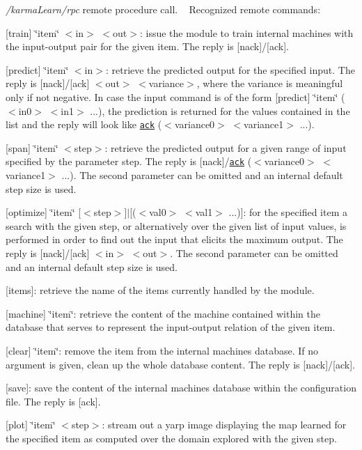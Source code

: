 \begin{DoxyItemize}
\item {\itshape /karma\+Learn/rpc} remote procedure call. ~\newline
 Recognized remote commands\+:
\begin{DoxyItemize}
\item \mbox{[}train\mbox{]} \char`\"{}item\char`\"{} $<$in$>$ $<$out$>$\+: issue the module to train internal machines with the input-\/output pair for the given item. The reply is \mbox{[}nack\mbox{]}/\mbox{[}ack\mbox{]}.
\item \mbox{[}predict\mbox{]} \char`\"{}item\char`\"{} $<$in$>$\+: retrieve the predicted output for the specified input. The reply is \mbox{[}nack\mbox{]}/\mbox{[}ack\mbox{]} $<$out$>$ $<$variance$>$, where the variance is meaningful only if not negative. In case the input command is of the form \mbox{[}predict\mbox{]} \char`\"{}item\char`\"{} ($<$in0$>$ $<$in1$>$ ...), the prediction is returned for the values contained in the list and the reply will look like \href{out0> <out1> ...}{\tt ack} ($<$variance0$>$ $<$variance1$>$ ...).
\item \mbox{[}span\mbox{]} \char`\"{}item\char`\"{} $<$step$>$\+: retrieve the predicted output for a given range of input specified by the parameter step. The reply is \mbox{[}nack\mbox{]}/\href{out0> <out1> ...}{\tt ack} ($<$variance0$>$ $<$variance1$>$ ...). The second parameter can be omitted and an internal default step size is used.
\item \mbox{[}optimize\mbox{]} \char`\"{}item\char`\"{} \mbox{[}$<$step$>$\mbox{]}$\vert$\mbox{[}($<$val0$>$ $<$val1$>$ ...)\mbox{]}\+: for the specified item a search with the given step, or alternatively over the given list of input values, is performed in order to find out the input that elicits the maximum output. The reply is \mbox{[}nack\mbox{]}/\mbox{[}ack\mbox{]} $<$in$>$ $<$out$>$. The second parameter can be omitted and an internal default step size is used.
\item \mbox{[}items\mbox{]}\+: retrieve the name of the items currently handled by the module.
\item \mbox{[}machine\mbox{]} \char`\"{}item\char`\"{}\+: retrieve the content of the machine contained within the database that serves to represent the input-\/output relation of the given item.
\item \mbox{[}clear\mbox{]} \char`\"{}item\char`\"{}\+: remove the item from the internal machines database. If no argument is given, clean up the whole database content. The reply is \mbox{[}nack\mbox{]}/\mbox{[}ack\mbox{]}.
\item \mbox{[}save\mbox{]}\+: save the content of the internal machines database within the configuration file. The reply is \mbox{[}ack\mbox{]}.
\item \mbox{[}plot\mbox{]} \char`\"{}item\char`\"{} $<$step$>$\+: stream out a yarp image displaying the map learned for the specified item as computed over the domain explored with the given step.
\end{DoxyItemize}
\end{DoxyItemize}

